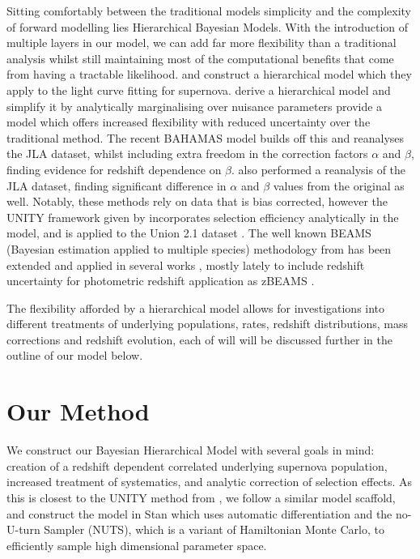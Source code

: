 \documentclass[a4paper,fleqn,usenatbib]{mnras}
\newcommand{\rubin}{\citetalias{Rubin2015}}
\begin{document}
Sitting comfortably between the traditional models simplicity and the complexity of forward modelling lies Hierarchical Bayesian Models. With the introduction of multiple layers in our model, we can add far more flexibility than a traditional analysis whilst still maintaining most of the computational benefits that come from having a tractable likelihood. \citet{Mandel2009} and \citet{Mandel2011} construct a hierarchical model which they apply to the light curve fitting for supernova. \citet{March2011, March2014, Karpenka2015} derive a hierarchical model and simplify it by analytically marginalising over nuisance parameters provide a model which offers increased flexibility with reduced uncertainty over the traditional method. The recent BAHAMAS model \citep{Shariff2016} builds off this and reanalyses the JLA dataset, whilst including extra freedom in the correction factors $\alpha$ and $\beta$, finding evidence for redshift dependence on $\beta$. \citet{Ma2016} also performed a reanalysis of the JLA dataset, finding significant difference in $\alpha$ and $\beta$ values from the original as well. Notably, these methods rely on data that is bias corrected, however the UNITY framework given by \citet{Rubin2015} incorporates selection efficiency analytically in the model, and is applied to the Union 2.1 dataset \citep{Suzuki2012}. The well known BEAMS (Bayesian estimation applied to multiple species) methodology from \citet{Kunz2007} has been extended and applied in several works \citep{Hlozek2012}, mostly lately to include redshift uncertainty for photometric redshift application as zBEAMS \citep{Roberts2017}. 

The flexibility afforded by a hierarchical model allows for investigations into different treatments of underlying populations, rates, redshift distributions, mass corrections and redshift evolution, each of will will be discussed further in the outline of our model below.









\section{Our Method}
\label{sec:method}

We construct our Bayesian Hierarchical Model with several goals in mind: creation of a redshift dependent correlated underlying supernova population, increased treatment of systematics, and analytic correction of selection effects. As this is closest to the UNITY method from \citet[][hereafter denoted \rubin]{Rubin2015}, we follow a similar model scaffold, and construct the model in Stan \citep{Carpenter2017, StanDevelopmentTeam2017} which uses automatic differentiation and the no-U-turn Sampler (NUTS), which is a variant of Hamiltonian Monte Carlo, to efficiently sample high dimensional parameter space.
\end{document}

